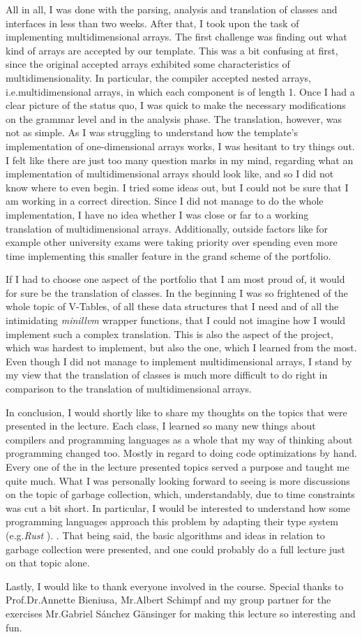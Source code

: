 All in all, I was done with the parsing, analysis and translation
of classes and interfaces in less than two weeks.
After that, I took upon the task of implementing multidimensional arrays.
The first challenge was finding out what kind of arrays are accepted
by our template.
This was a bit confusing at first, since the original accepted arrays
exhibited some characteristics of multidimensionality.
In particular, the compiler accepted nested arrays, i.e.\@ multidimensional arrays,
in which each component is of length 1.
Once I had a clear picture of the status quo, I was quick 
to make the necessary modifications on the grammar level
and in the analysis phase.
The translation, however, was not as simple.
As I was struggling to understand how the
template's implementation of one-dimensional arrays works, 
I was hesitant to try things out.
I felt like there are just too many question marks in my mind, regarding
what an implementation of multidimensional arrays should look like, and so
I did not know where to even begin.
I tried some ideas out, but I could not be sure that I am working
in a correct direction. Since I did not manage to do the whole implementation,
I have no idea whether I was close or far to a working translation of multidimensional arrays.
Additionally, outside factors like for example other university exams
were taking priority over spending even more time
implementing this smaller feature in the grand scheme of the portfolio.

If I had to choose one aspect of the portfolio that I am most proud of,
it would for sure be the translation of classes.
In the beginning I was so frightened of the whole topic of V-Tables,
of all these data structures that I need and of all the intimidating
\textit{minillvm} wrapper functions, that I could not imagine how I would implement
such a complex translation.
This is also the aspect of the project, which was hardest to implement, but also the one,
which I learned from the most. Even though I did not manage to implement
multidimensional arrays, I stand by my view that the translation of classes
is much more difficult to do right in comparison to the translation of multidimensional arrays.

In conclusion, I would shortly like to share my thoughts on the 
topics that were presented in the lecture.
Each class, I learned so many new things about compilers and 
programming languages as a whole that my way of thinking
about programming changed too. Mostly in regard to doing
code optimizations by hand.
Every one of the in the lecture presented topics served a purpose and
taught me quite much.
What I was personally looking forward to seeing
is more discussions on the topic of garbage collection, which, understandably, due to time
constraints was cut a bit short.
In particular, I would be interested to understand how some programming languages approach this problem by
adapting their type system (e.g.\@ \textit{Rust} \cite{rust}).
. That being said, the basic
algorithms and ideas in relation to garbage collection were presented, 
and one could probably do a full lecture just on that topic alone. 

Lastly, I would like to thank everyone involved in the course. Special thanks
to Prof.\@ Dr.\@ Annette Bieniusa, Mr.\@ Albert Schimpf and my group partner
for the exercises Mr.\@ Gabriel Sánchez Gänsinger for making this lecture 
so interesting and fun.